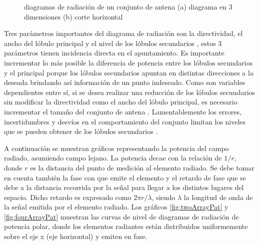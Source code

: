 \begin{figure}[H]
 \centering
	\caption{diagramas de radiación de un conjunto de antena (a) diagrama en 3 dimensiones \cite{arrayPattern} (b) corte horizontal}
 \label{fig:arrayPattern}
\end{figure}

Tres parámetros importantes del diagrama de radiación son la directividad, el ancho del lóbulo principal y el nivel de los
lóbulos secundarios \cite{Hsiao1985}, estos 3 parámetros tienen incidencia directa en el apuntamiento. Es importante incrementar
lo más posible la diferencia de potencia entre los lóbulos secundarios y el principal porque los lóbulos secundarios apuntan
en distintas direcciones a la deseada brindando así información de un punto indeseado. Como son variables dependientes entre
sí, si se desea realizar una reducción de los lóbulos secundarios sin modificar la directividad como el ancho del lóbulo 
principal, es necesario incrementar el tamaño del conjunto de antena \cite{Hsiao1985}. 
Lamentablemente los errores, incertidumbres y desvíos en el comportamiento del conjunto limitan los niveles que se pueden 
obtener de los lóbulos secundarios \cite{Hsiao1985}.

A continuación se muestran gráficos representando la potencia del campo radiado, asumiendo campo lejano. La potencia decae
con la relación de $1/r$, donde $r$ es la distancia del punto de medición al elemento radiado. Se debe tomar en cuenta también
la fase con que emite el elemento y el retardo de fase que se debe a la distancia recorrida por la señal para llegar a los 
distintos lugares del espacio. Dicho retardo es expresado como $2\pi r/\lambda$, siendo $\lambda$ la longitud de onda de la 
señal emitida por el elemento radiado. Los gráficos \ref{fig:twoArrayPat} y \ref{fig:fourArrayPat} muestran las curvas de 
nivel de diagramas de radiación de potencia polar, donde los elementos radiantes están distribuidos uniformemente sobre el eje
x (eje horizontal) y emiten en fase.

